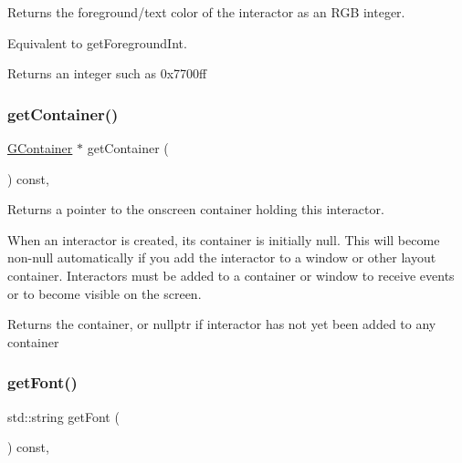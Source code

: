 Returns the foreground/text color of the interactor as an R\+GB integer. 

Equivalent to get\+Foreground\+Int. \begin{DoxyReturn}{Returns}
an integer such as 0x7700ff 
\end{DoxyReturn}
\mbox{\label{classGInteractor_a7a6e317c29d61030929b4cd2d1c00fe7}} 
\subsubsection{\texorpdfstring{get\+Container()}{getContainer()}}
{\footnotesize\ttfamily \mbox{\hyperlink{classGContainer}{G\+Container}} $\ast$ get\+Container (\begin{DoxyParamCaption}{ }\end{DoxyParamCaption}) const\hspace{0.3cm}{\ttfamily [virtual]}, {\ttfamily [inherited]}}



Returns a pointer to the onscreen container holding this interactor. 

When an interactor is created, its container is initially null. This will become non-\/null automatically if you add the interactor to a window or other layout container. Interactors must be added to a container or window to receive events or to become visible on the screen. \begin{DoxyReturn}{Returns}
the container, or nullptr if interactor has not yet been added to any container 
\end{DoxyReturn}
\mbox{\label{classGInteractor_a894a5502900794eeb27d084c21f1d77d}} 
\subsubsection{\texorpdfstring{get\+Font()}{getFont()}}
{\footnotesize\ttfamily std\+::string get\+Font (\begin{DoxyParamCaption}{ }\end{DoxyParamCaption}) const\hspace{0.3cm}{\ttfamily [virtual]}, {\ttfamily [inherited]}}



